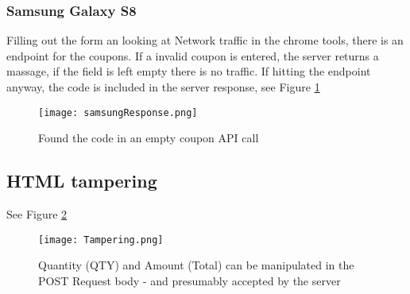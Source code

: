 \documentclass[
	letterpaper, %
	10pt, %
	unnumberedsections, %
	twoside, %
]{APAAssignment}
\begin{document}
\begin{appendices}
\subsubsection{Samsung Galaxy S8}
Filling out the form an looking at Network traffic in the chrome tools, there is an endpoint for the coupons. If a invalid coupon is entered, the server returns a massage, if the field is left empty there is no traffic. If hitting the endpoint anyway, the code is included in the server response,
see Figure \ref{fig:app:samsungResponse}


\begin{figure}[!htp] %
	\centering
	\texttt{[image: samsungResponse.png]}
	\caption{Found the code in an empty coupon API call}
	\label{fig:app:samsungResponse}
\end{figure}


\subsection{HTML tampering}
See Figure \ref{fig:app:Tampering}
\begin{figure}[!htp] %
	\centering
	\texttt{[image: Tampering.png]}
	\caption{Quantity (QTY) and Amount (Total) can be manipulated in the POST Request body - and presumably accepted by the server}
	\label{fig:app:Tampering}
\end{figure}

\end{appendices}
\end{document}
